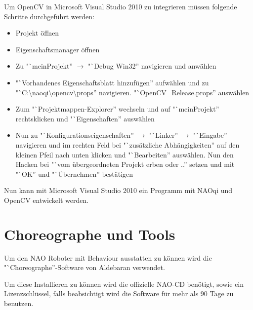             Um OpenCV in Microsoft Visual Studio 2010 zu integrieren müssen
            folgende Schritte durchgeführt werden:

            \begin{itemize}
                \item Projekt öffnen
                \item Eigenschaftsmanager öffnen
                \item Zu "`meinProjekt'' $\rightarrow$ "`Debug Win32''
                    navigieren und anwählen
                \item "`Vorhandenes Eigenschaftsblatt hinzufügen'' aufwählen und
                    zu
                    "`C:\textbackslash{}naoqi\textbackslash{}opencv\textbackslash{}props''
                    navigieren. "`OpenCV\_Release.props'' auswählen

                \item Zum "`Projektmappen-Explorer'' wechseln und auf
                    "`meinProjekt'' rechtsklicken und "`Eigenschaften''
                    auswählen

                \item Nun zu "`Konfigurationseigenschaften'' $\rightarrow$ "`Linker'' $\rightarrow$
                    "`Eingabe'' navigieren und im rechten Feld bei "`zusätzliche
                    Abhängigkeiten'' auf den kleinen Pfeil nach unten klicken und
                    "`Bearbeiten'' auswählen. Nun den Hacken bei "`vom
                    übergeordneten Projekt erben oder ..'' setzen und mit "`OK''
                    und "`Übernehmen'' bestätigen
            \end{itemize}

            Nun kann mit Microsoft Visual Studio 2010 ein Programm mit NAOqi und
            OpenCV entwickelt werden.

    \section{Choreographe und Tools}
        \label{chap:inst:choero}

        Um den NAO Roboter mit Behaviour ausstatten zu können wird die
        "`Choreographe''-Software von Aldebaran verwendet.

        Um diese Installieren zu können wird die offizielle NAO-\ac{CD}
        benötigt, sowie ein Lizenzschlüssel, falls beabsichtigt wird die
        Software für mehr als 90 Tage zu benutzen.

